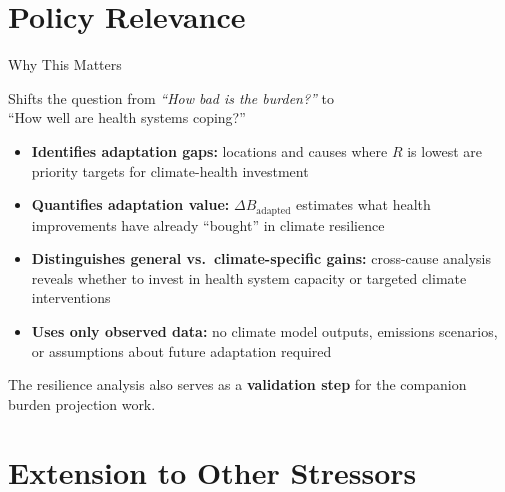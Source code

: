 \documentclass[aspectratio=169,10pt]{beamer}
\begin{document}
\section{Policy Relevance}

\begin{frame}{Why This Matters}

  Shifts the question from \emph{``How bad is the burden?''} to\\
  \alert{``How well are health systems coping?''}

  \vspace{1em}
  \begin{itemize}
    \item \textbf{Identifies adaptation gaps:} locations and causes where $R$ is lowest are priority targets for climate-health investment
    \item \textbf{Quantifies adaptation value:} $\Delta B_{\text{adapted}}$ estimates what health improvements have already ``bought'' in climate resilience
    \item \textbf{Distinguishes general vs.\ climate-specific gains:} cross-cause analysis reveals whether to invest in health system capacity or targeted climate interventions
    \item \textbf{Uses only observed data:} no climate model outputs, emissions scenarios, or assumptions about future adaptation required
  \end{itemize}

  \vspace{1em}
  The resilience analysis also serves as a \textbf{validation step} for the companion burden projection work.
\end{frame}

\section{Extension to Other Stressors}
\end{document}
